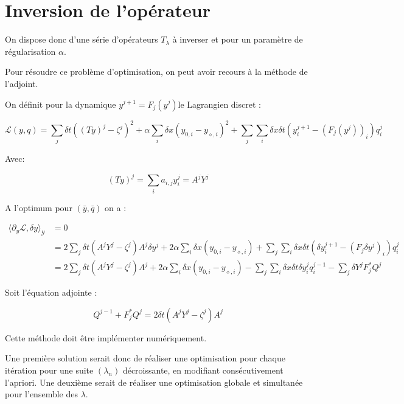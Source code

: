 \documentclass[a4paper]{article}
\begin{document}
\section{Inversion de l'opérateur}

On dispose donc d'une série d'opérateurs $T_{\lambda}$ à inverser et pour un paramètre de régularisation $\alpha$. 

Pour résoudre ce problème d'optimisation, on peut avoir recours à la méthode de l'adjoint.

On définit pour la dynamique $y^{j+1} = F_j(y^j)$le Lagrangien discret : 

\[
\mathscr{L}(y,q) = \sum_j \delta t ((Ty)^j - \zeta^j)^2 
+ \alpha \sum_i \delta x (y_{0,i} - y_{\diamond,i})^2 
+ \sum_j \sum_i \delta x \delta t(y_i^{j+1} - (F_j(y^j))_i) q_i^j 
\]

Avec:

\[
(Ty)^j = \sum_i a_{i,j} y_i^j = A^j Y^j
\]

A l'optimum pour $(\bar{y},\bar{q})$ on a :

\[
\begin{split}
\langle \partial_y \mathscr{L}, \delta y \rangle_\mathscr{Y} &= 0\\
                                                             &= 2\sum_j \delta t (A^j Y^j - \zeta^j) A^j \delta y^j
															 + 2 \alpha \sum_i \delta x (y_{0,i} - y_{\diamond,i})
															 + \sum_j \sum_i \delta x \delta t
															 (\delta y_i^{j+1} -(F_j\delta y^j)_i) q_i^j \\
															 &= 2\sum_j \delta t (A^j Y^j - \zeta^j) A^j 
															 + 2 \alpha \sum_i \delta x (y_{0,i} - y_{\diamond,i})
															 -\sum_j \sum_i \delta x \delta t
															 \delta y_i^{j} q_i^{j-1}
															 - \sum_j \delta Y^j F_j^*Q^j
\end{split}
\]

Soit l'équation adjointe :

\[
Q^{j-1} + F_j^*Q^j = 2 \delta t (A^j Y^j - \zeta^j) A^j 
\]

Cette méthode doit être implémenter numériquement.


Une première solution serait donc de réaliser une optimisation pour chaque itération pour une suite $(\lambda_n)$ décroissante, 
en modifiant consécutivement l'apriori. 
Une deuxième serait de réaliser une optimisation globale et simultanée pour l'ensemble des $\lambda$.



\end{document}
